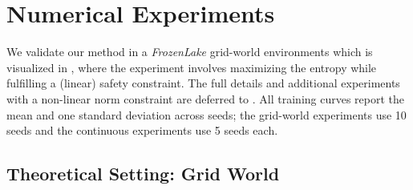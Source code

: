 \documentclass{article}
\theoremstyle{plain}
\theoremstyle{definition}
\theoremstyle{remark}
\newcounter{chapter}
\begin{document}
\vspace{-0.3cm}
\section{Numerical Experiments}
\label{chapter:Experiments}
We validate our method in a \emph{FrozenLake} grid-world environments which is visualized
in , where the experiment involves maximizing the entropy
while fulfilling a (linear) safety constraint.
The full details and additional experiments with a non-linear norm
constraint are deferred to . All
training curves report the mean and one standard deviation across seeds;
the grid-world experiments use 10 seeds and the continuous experiments use
5 seeds each.

\subsection{Theoretical Setting: Grid World} \label{sec:NumericalExperimentsLinearPerformanceConstraints}
\end{document}
